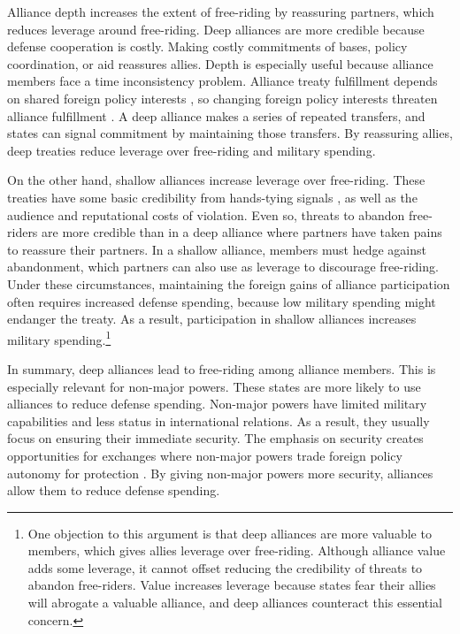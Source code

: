 \documentclass[12pt]{article}
\begin{document}
Alliance depth increases the extent of free-riding by reassuring partners, which reduces leverage around free-riding.  
Deep alliances are more credible because defense cooperation is costly. 
Making costly commitments of bases, policy coordination, or aid reassures allies. 
Depth is especially useful because alliance members face a time inconsistency problem. 
Alliance treaty fulfillment depends on shared foreign policy interests \citep{Morrow2000, Leeds2003a}, so changing foreign policy interests threaten alliance fulfillment \citep{LeedsSavun2007}. 
A deep alliance makes a series of repeated transfers, and states can signal commitment by maintaining those transfers.  
By reassuring allies, deep treaties reduce leverage over free-riding and military spending. 


On the other hand, shallow alliances increase leverage over free-riding. 
These treaties have some basic credibility from hands-tying signals \citep{Fearon1997}, as well as the audience \cite{Morrow2000} and reputational \citep{Gibler2008, Crescenzietal2012} costs of violation.
Even so, threats to abandon free-riders are more credible than in a deep alliance where partners have taken pains to reassure their partners.  
In a shallow alliance, members must hedge against abandonment, which partners can also use as leverage to discourage free-riding. 
Under these circumstances, maintaining the foreign gains of alliance participation often requires increased defense spending, because low military spending might endanger the treaty. 
As a result, participation in shallow alliances increases military spending.\footnote{
One objection to this argument is that deep alliances are more valuable to members, which gives allies leverage over free-riding. 
Although alliance value adds some leverage, it cannot offset reducing the credibility of threats to abandon free-riders.
Value increases leverage because states fear their allies will abrogate a valuable alliance, and deep alliances counteract this essential concern. 
}


In summary, deep alliances lead to free-riding among alliance members. 
This is especially relevant for non-major powers.
These states are more likely to use alliances to reduce defense spending. 
Non-major powers have limited military capabilities and less status in international relations. 
As a result, they usually focus on ensuring their immediate security.  
The emphasis on security creates opportunities for exchanges where non-major powers trade foreign policy autonomy for protection \citep{Altfield1984, Morrow1991}. 
By giving non-major powers more security, alliances allow them to reduce defense spending. 
\end{document}
